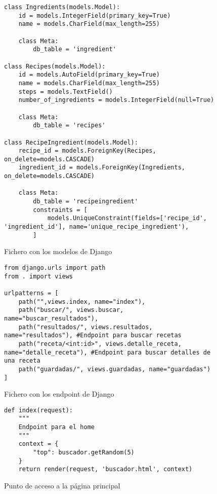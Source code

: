 \begin{figure}[H]
\begin{lstlisting}[style=consola]
class Ingredients(models.Model):
    id = models.IntegerField(primary_key=True)
    name = models.CharField(max_length=255)

    class Meta:
        db_table = 'ingredient'

class Recipes(models.Model):
    id = models.AutoField(primary_key=True)
    name = models.CharField(max_length=255)
    steps = models.TextField()
    number_of_ingredients = models.IntegerField(null=True)

    class Meta:
        db_table = 'recipes'

class RecipeIngredient(models.Model):
    recipe_id = models.ForeignKey(Recipes, on_delete=models.CASCADE)
    ingredient_id = models.ForeignKey(Ingredients, on_delete=models.CASCADE)

    class Meta:
        db_table = 'recipeingredient'
        constraints = [
            models.UniqueConstraint(fields=['recipe_id', 'ingredient_id'], name='unique_recipe_ingredient'),
        ]

\end{lstlisting}
\caption{Fichero con los modelos de \gls{Django}}
\label{sni:django-modelos}
\end{figure}

\begin{figure}[H]
\begin{lstlisting}[style=consola]
from django.urls import path
from . import views

urlpatterns = [
    path("",views.index, name="index"),
    path("buscar/", views.buscar, name="buscar_resultados"),
    path("resultados/", views.resultados, name="resultados"), #Endpoint para buscar recetas
    path("receta/<int:id>", views.detalle_receta, name="detalle_receta"), #Endpoint para buscar detalles de una receta
    path("guardadas/", views.guardadas, name="guardadas")
]
\end{lstlisting}
\caption{Fichero con los \gls{endpoint} de \gls{Django}}
\label{sni:django-urls}
\end{figure}

\begin{figure}[H]
\begin{lstlisting}[style=consola]
def index(request):
    """
    Endpoint para el home
    """
    context = {
        "top": buscador.getRandom(5)
    }
    return render(request, 'buscador.html', context)
\end{lstlisting}
\caption{Punto de acceso a la página principal}
\label{sni:django-index}
\end{figure}

